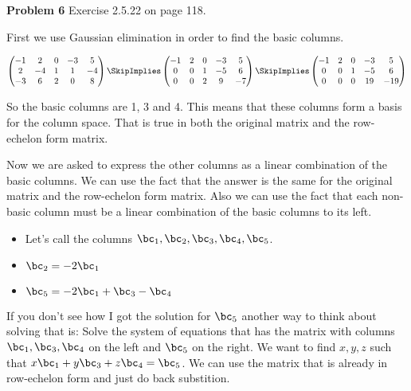 \documentclass[oneside,12pt]{amsart}
\begin{document}

\bigskip

\textbf{Problem 6} Exercise 2.5.22 on page 118.

First we use Gaussian elimination in order to find the basic columns.

\bigskip

$
\begin{pmatrix}
-1 & 2 & 0 & -3 & 5 \\
2 & -4 & 1 & 1 & -4 \\
-3 & 6 & 2 & 0 & 8
\end{pmatrix}
\SkipImplies
\begin{pmatrix}
-1 & 2 & 0 & -3 & 5 \\
0 & 0 & 1 & -5 & 6 \\
0 & 0 & 2 & 9 & -7
\end{pmatrix}
\SkipImplies
\begin{pmatrix}
-1 & 2 & 0 & -3 & 5 \\
0 & 0 & 1 & -5 & 6 \\
0 & 0 & 0 & 19 & -19
\end{pmatrix}
$

\bigskip

So the basic columns are 1, 3 and 4. This means that these columns form a basis
for the column space. That is true in both the original matrix and the row-echelon form
matrix.

Now we are asked to express the other columns as a linear combination of the
basic columns. We can use the fact that the answer is the same for the original
matrix and the row-echelon form matrix. Also we can use the fact that each
non-basic column must be a linear combination of the basic columns to its left.

\begin{itemize}
  \item Let's call the columns $\bc_1,\bc_2,\bc_3,\bc_4,\bc_5$.
  \item $\bc_2 = -2 \bc_1$
  \item  $\bc_5 = -2 \bc_1 + \bc_3 -\bc_4$
\end{itemize}

If you don't see how I got the solution for $\bc_5$
another way to think about solving that is: Solve the system of equations
that has the matrix with columns $\bc_1,\bc_3, \bc_4$ on the left and $\bc_5$ on the right.
We want to find $x,y,z$ such that $x\bc_1+y\bc_3+z\bc_4 = \bc_5$.
We can use the matrix that is already in row-echelon form and just do back substition.
\end{document}

